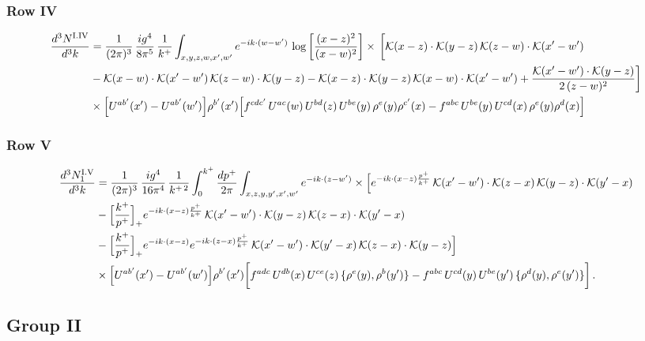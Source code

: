 \documentclass[9pt]{article}
\numberwithin{equation}{section}
\begin{document}
{\color{green}\subsubsection*{Row IV}
\begin{align}
\frac{d^{3}N^{\rm I.IV}}{d^{3}k} & = \frac{1}{(2\pi)^{3}}\,\frac{ig^{4}}{8\pi^{5}}\,\frac{1}{k^{+}}\int_{x,y,z,w,x',w'}e^{-ik\cdot(w-w')}\,\log\left[\frac{(x-z)^{2}}{(x-w)^{2}}\right]\times\,\bigg[\mathcal{K}(x-z)\cdot\mathcal{K}(y-z)\,\mathcal{K}(z-w)\cdot\mathcal{K}(x'-w')\notag \\ & -\mathcal{K}(x-w)\cdot\mathcal{K}(x'-w')\,\mathcal{K}(z-w)\cdot\mathcal{K}(y-z)-\mathcal{K}(x-z)\cdot\mathcal{K}(y-z)\,\mathcal{K}(x-w)\cdot\mathcal{K}(x'-w')+\frac{\mathcal{K}(x'-w')\cdot\mathcal{K}(y-z)}{2\,(z-w)^{2}}\bigg]\notag \\ & \times\Big[U^{ab'}(x')-U^{ab'}(w')\Big]\rho^{b'}(x')\Big[f^{cdc'}\,U^{ac}(w)\,U^{bd}(z)\,U^{be}(y)\,\rho^{e}(y)\rho^{c'}(x)-f^{abc}\,U^{be}(y)\,U^{cd}(x)\,\rho^{e}(y)\rho^{d}(x)\Big]\label{eq:B-I4}
\end{align}}
\subsubsection*{Row V}
\begin{align}
\frac{d^{3}N^{\rm I.V}_{1}}{d^{3}k} & =\frac{1}{(2\pi)^{3}}\,\frac{ig^{4}}{16\pi^{4}}\,\frac{1}{k^{+\,2}}\int_{0}^{k^{+}}\frac{dp^{+}}{2\pi}\int_{x,z,y,y',x',w'}e^{-ik\cdot(z-w')}\times\Big[e^{-ik\cdot(x-z)\frac{p^{+}}{k^{+}}}\,\mathcal{K}(x'-w')\cdot\mathcal{K}(z-x)\,\mathcal{K}(y-z)\cdot\mathcal{K}(y'-x)\notag\\
&-\Big[\frac{k^{+}}{p^{+}}\Big]_{+}e^{-ik\cdot(x-z)\frac{p^{+}}{k^{+}}}\,\mathcal{K}(x'-w')\cdot\mathcal{K}(y-z)\,\mathcal{K}(z-x)\cdot\mathcal{K}(y'-x)\notag\\
&-\Big[\frac{k^{+}}{p^{+}}\Big]_{+}e^{-ik\cdot(x-z)}e^{-ik\cdot(z-x)\frac{p^{+}}{k^{+}}}\,\mathcal{K}(x'-w')\cdot\mathcal{K}(y'-x)\,\mathcal{K}(z-x)\cdot\mathcal{K}(y-z)\Big]\notag\\
&\times\Big[U^{ab'}(x')-U^{ab'}(w')\Big]\rho^{b'}(x')\bigg[f^{adc}\,U^{db}(x)\,U^{ce}(z)\,\{\rho^{e}(y),\rho^{b}(y')\}-f^{abc}\,U^{cd}(y)\,U^{be}(y')\,\{\rho^{d}(y),\rho^{e}(y')\}\bigg]\,.\label{eq:B-I5}
\end{align}
\subsection{Group II}
\end{document}
